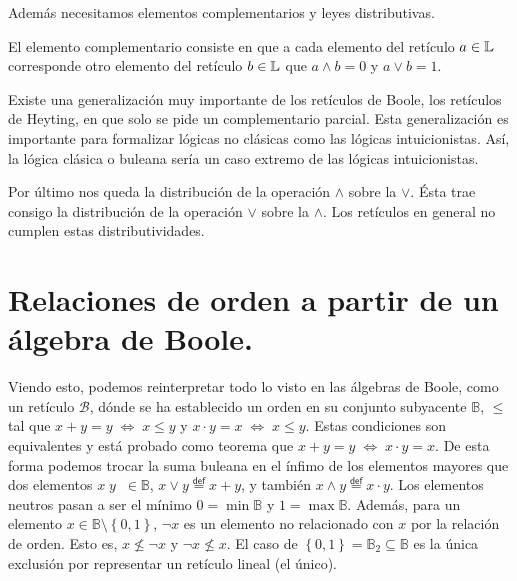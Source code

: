 \documentclass[final,12pt,a4paper,twoside,fleqn]{extbook}
\newcommand{\mathdef}{\ensuremath{\stackrel{\mathsf{def}}{{}={}}}}
\newcommand{\set}[1]{\ensuremath{\left\lbrace{#1}\right\rbrace}}
\newcommand {\setCompr}[2]{
	\ensuremath{
		\left\lbrace{ 
			#1 {\;\big{\vert}\;} #2
        }\right\rbrace
    }
}
\newcommand{\setB}{\ensuremath{\mathbb{B}}}
\newcommand{\algB}{\ensuremath{\mathscr{B}}}
\theoremstyle{definition}
\theoremstyle{remark}
\begin{document}
	Además necesitamos elementos complementarios y leyes distributivas.



	El elemento complementario consiste en que a cada elemento del retículo
\(a\in\mathbb{L}\) corresponde otro elemento del retículo
\(b\in\mathbb{L}\) que \(a\wedge b = 0\) y \(a\vee b = 1\).



	Existe una generalización muy importante de los retículos de Boole, los
retículos de Heyting, en que solo se pide un complementario parcial. Esta
generalización es importante para formalizar lógicas no clásicas como las
lógicas intuicionistas. Así, la lógica clásica o buleana sería un caso
extremo de las lógicas intuicionistas.



	Por último nos queda la distribución de la operación \(\wedge\) sobre la
\(\vee\). Ésta trae consigo la distribución de la operación \(\vee\) sobre la
\(\wedge\). Los retículos en general no cumplen estas distributividades.



\section{Relaciones de orden a partir de un álgebra de Boole.}



	Viendo esto, podemos reinterpretar todo lo visto en las álgebras de
Boole, como un retículo \(\algB\), dónde se ha establecido un orden en su
conjunto subyacente \(\setB\), \(\leq\) tal que \(x+y = y \;\iff \; x \leq
y\) y \(x \cdot y = x \;\iff \; x \leq y\). Estas condiciones son
equivalentes y está probado como teorema que \(x+y = y \;\iff \; x\cdot y =
x\). De esta forma podemos trocar la suma buleana en el ínfimo de los
elementos mayores que dos elementos \(x\;y\;\;\in\setB\), \(x\vee y \mathdef
x+y\), y también \( x \wedge y \mathdef x \cdot y \). Los elementos neutros
pasan a ser el mínimo \(0 = \min\setB\) y \(1 = \max\setB\). Además, para un
elemento \(x\in\setB\setminus\set{0,1}\), \(\neg x\) es un elemento no
relacionado con \(x\) por la relación de orden. Esto es, \(x \nleq \neg x\) y
\(\neg x \nleq x\). El caso de \( \set{0,1} = \setB_2 \subseteq \setB \) es
la única exclusión por representar un retículo lineal (el único).



\end{document}
